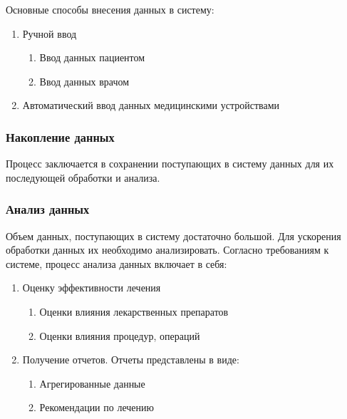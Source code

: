 Основные способы внесения данных в систему:

\begin{enumerate}
  \item Ручной ввод
  \begin{enumerate}
    \item Ввод данных пациентом
    \item Ввод данных врачом
  \end{enumerate}
  \item Автоматический ввод данных медицинскими устройствами
\end{enumerate}

\subsubsection{Накопление данных}
Процесс заключается в сохранении поступающих в систему данных для их последующей
обработки и анализа.

\subsubsection{Анализ данных}
Объем данных, поступающих в систему достаточно большой. Для ускорения обработки
данных их необходимо анализировать. Согласно требованиям к системе, процесс
анализа данных включает в себя:

\begin{enumerate}
  \item Оценку эффективности лечения
  \begin{enumerate}
    \item Оценки влияния лекарственных препаратов
    \item Оценки влияния процедур, операций 
  \end{enumerate}
  \item Получение отчетов. Отчеты представлены в виде:
  \begin{enumerate}
    \item Агрегированные данные
    \item Рекомендации по лечению
  \end{enumerate}  
\end{enumerate}










